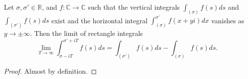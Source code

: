 \begin{lemma}
\label{RectangleIntegral_tendsTo_VerticalIntegral}
\leanok
Let $\sigma,\sigma' \in \mathbb{R}$, and $f : \mathbb{C} \to \mathbb{C}$ such that
  the vertical integrals $\int_{(\sigma)}f(s)ds$ and $\int_{(\sigma')}f(s)ds$ exist and
  the horizontal integral $\int_{(\sigma)}^{\sigma'}f(x + yi)dx$ vanishes as $y \to \pm \infty$.
  Then the limit of rectangle integrals
  $$\lim_{T\to\infty}\int_{\sigma-iT}^{\sigma'+iT}f(s)ds =
  \int_{(\sigma')}f(s)ds - \int_{(\sigma)}f(s)ds.$$
\end{lemma}
\begin{proof}
\leanok
Almost by definition.
\end{proof}
